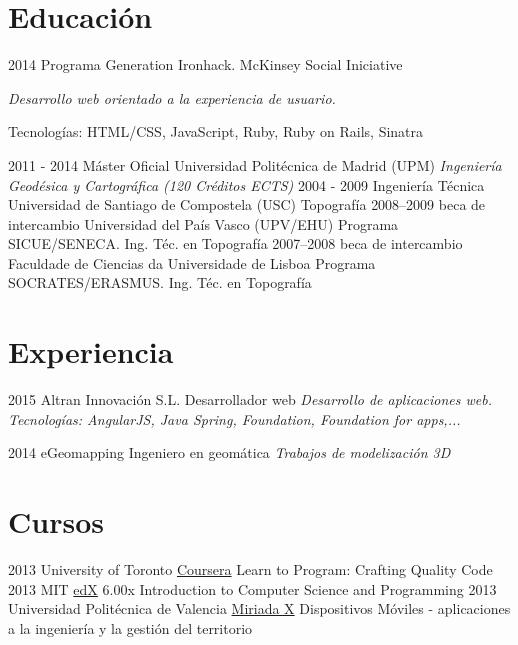 \documentclass[]{friggeri-cv}
\begin{document}
\section{Educación}

\begin{entrylist}
  \entry
    {2014}
    {Programa Generation }%
    {Ironhack. McKinsey Social Iniciative}
    {\emph{Desarrollo web orientado a la experiencia de usuario.} \par Tecnologías: HTML/CSS, JavaScript, Ruby, Ruby on Rails, Sinatra}
  \entry    
    {2011 - 2014}
    {Máster Oficial}%
    {Universidad Politécnica de Madrid (UPM)}
    {\emph{Ingeniería Geodésica y Cartográfica (120 Créditos ECTS)}}
  \entry
    {2004 - 2009}
    {Ingeniería Técnica}
    {Universidad de Santiago de Compostela (USC)}
    {Topografía}
  \entry
    {2008–2009}
    {beca de intercambio}
    {Universidad del País Vasco (UPV/EHU)}
    {Programa SICUE/SENECA. Ing. Téc. en Topografía}
  \entry
    {2007–2008}
    {beca de intercambio}
    {Faculdade de Ciencias da Universidade de Lisboa}
    {Programa SOCRATES/ERASMUS. Ing. Téc. en Topografía}
\end{entrylist}

\section{Experiencia}

\begin{entrylist}
  \entry
    {2015}
    {Altran Innovación S.L.}
    {Desarrollador web}
    {\emph{Desarrollo de aplicaciones web. Tecnologías: AngularJS, Java Spring, Foundation, Foundation for apps,...}}
\end{entrylist}

\begin{entrylist}
  \entry
    {2014}
    {eGeomapping}
    {Ingeniero en geomática}
    {\emph{Trabajos de modelización 3D}}
\end{entrylist}

\section{Cursos}

\begin{entrylist}
  \entry
    {2013}
    {University of Toronto}
    {\href{https://www.coursera.org/course/programming2}{Coursera}}
    {Learn to Program: Crafting Quality Code}
  \entry
    {2013}
    {MIT}
    {\href{https://courses.edx.org/courses/MITx/6.00x/2013_Spring/info}{edX}}
    {6.00x Introduction to Computer Science and Programming}
  \entry
    {2013}
    {Universidad Politécnica de Valencia}
    {\href{http://miriadax.net/web/dispositivos_moviles}{Miriada X}}
    {Dispositivos Móviles - aplicaciones a la ingeniería y la gestión del territorio}
\end{entrylist}
\end{document}
